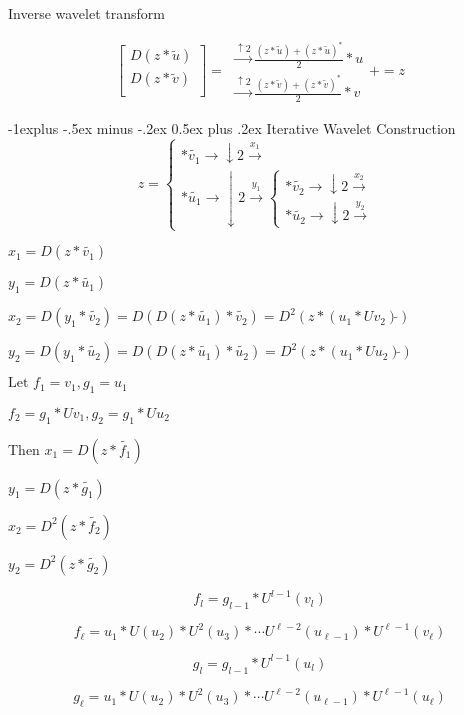 \documentclass[10pt,landscape]{article}
\makeatletter
\renewcommand{\subsection}{\@startsection{subsection}{2}{0mm}%
                                {-1explus -.5ex minus -.2ex}%
                                {0.5ex plus .2ex}%
                                {\normalfont\normalsize\bfseries}}
\makeatother
\begin{document}
\begin{multicols}{3}
Inverse wavelet transform

$$
\begin{bmatrix}
D(z * \tilde{u}) \\
D(z * \tilde{v}) \\
\end{bmatrix}
=
\begin{array}{c}
\xrightarrow{\uparrow2} \frac{(z*\tilde{u})+(z*\tilde{u})^{*}}{2}*u \\
\xrightarrow{\uparrow2} \frac{(z*\tilde{v})+(z*\tilde{v})^{*}}{2}*v
\end{array}
+
=
z
$$

\subsection{Iterative Wavelet Construction}
$$
z =
\left\{
\begin{array}{l}
* \tilde{v_1} \to \downarrow2 \xrightarrow{x_1} \\
* \tilde{u_1} \to \downarrow2 \xrightarrow{y_1} 
\left\{
\begin{array}{c}
* \tilde{v_2} \to \downarrow2 \xrightarrow{x_2} \\
* \tilde{u_2} \to \downarrow2 \xrightarrow{y_2}
\end{array}
\right.
\end{array}
\right.
$$

$ x_1 = D(z*\tilde{v_1}) $
 
$ y_1 = D(z*\tilde{u_1}) $

$ x_2 = D(y_1 * \tilde{v_2}) = D(D(z*\tilde{u_1})*\tilde{v_2}) = D^2(z*(u_1*Uv_2)\tilde{})$

$ y_2 = D(y_1 * \tilde{u_2}) = D(D(z*\tilde{u_1})*\tilde{u_2}) = D^2(z*(u_1*Uu_2)\tilde{})$

$
\text{Let } f_1 = v_1, g_1 = u_1
$

$
f_2 = g_1 * Uv_1, g_2 = g_1 * Uu_2
$

Then
$x_1 = D(z*\tilde{f_1})$

$y_1 = D(z*\tilde{g_1})$

$x_2 = D^2(z*\tilde{f_2})$

$y_2 = D^2(z*\tilde{g_2})$

$$
f_l = g_{l-1} * U^{l-1}(v_l)
$$

$$
f_\ell = u_1 * U(u_2) * U^2(u_3) * \cdots U^{\ell-2}(u_{\ell-1})*U^{\ell-1}(v_\ell)
$$

$$
g_l = g_{l-1}*U^{l-1}(u_l)
$$

$$
g_\ell = u_1 * U(u_2) * U^2(u_3) * \cdots U^{\ell-2}(u_{\ell-1})*U^{\ell-1}(u_\ell)
$$


\end{multicols}
\end{document}
